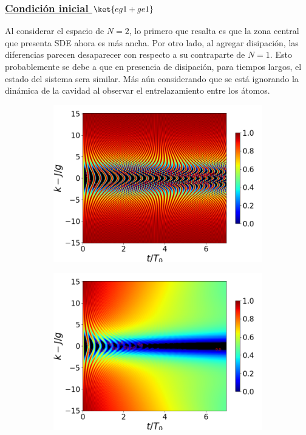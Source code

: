 \subsubsection{\underline{Condición inicial $\ket{eg1+ge1}$}}
Al considerar el espacio de $N=2$, lo primero que resalta es que la zona central que presenta SDE ahora es más ancha. Por otro lado, al agregar disipación, las diferencias parecen desaparecer con respecto a su contraparte de $N=1$. Esto probablemente se debe a que en presencia de disipación, para tiempos largos, el estado del sistema sera similar. Más aún considerando que se está ignorando la dinámica de la cavidad al observar el entrelazamiento entre los átomos.
\begin{figure}[h!]
    \centering
    \begin{subfigure}{0.49\textwidth}
        \includegraphics[width=\textwidth]{figuras/ch4/concu/k/eg1+ge1 d=0.0g x=0.0g J=15.0g gamma=0.25g concu k uni.png}
        \caption{}
        \label{fig4:concu k 1 uni}
    \end{subfigure}
    \hfill
    \begin{subfigure}{0.49\textwidth}
        \includegraphics[width=\textwidth]{figuras/ch4/concu/k/eg1+ge1 d=0.0g x=0.0g J=15.0g gamma=0.25g concu k dis.png}

\end{subfigure}
\end{figure}
